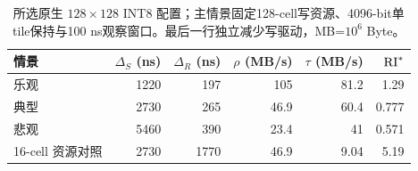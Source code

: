 \begin{table}[htbp]\centering\small
\begin{tabular}{@{}lrrrrr@{}}\toprule
情景 & $\Delta_S$ (ns) & $\Delta_R$ (ns) & $\rho$ (MB/s) & $\tau$ (MB/s) & $\mathrm{RI}^*$\\\midrule
乐观 & 1220 & 197 & 105 & 81.2 & 1.29\\
典型 & 2730 & 265 & 46.9 & 60.4 & 0.777\\
悲观 & 5460 & 390 & 23.4 & 41 & 0.571\\
16-cell 资源对照 & 2730 & 1770 & 46.9 & 9.04 & 5.19\\
\bottomrule\end{tabular}
\caption{所选原生 $128\times128$ INT8 配置；主情景固定128-cell写资源、4096-bit单tile保持与100 ns观察窗口。最后一行独立减少写驱动，MB=$10^6$ Byte。}
\label{10_fenor_3d:tab:result}\end{table}
